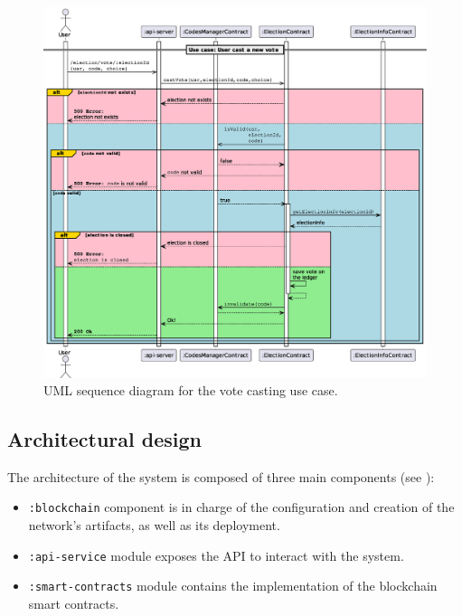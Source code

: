 \documentclass{scrartcl}
\begin{document}
\begin{figure}[h!]
    \centering
    \includegraphics[width=\linewidth]{figures/cast-vote-use-case.eps}
    \caption{UML sequence diagram for the vote casting use case.}
    \label{fig:cast-vote-use-case} 
\end{figure}

\subsection{Architectural design}

The architecture of the system is composed of three main components (see ):
\begin{itemize}
    \item \texttt{:blockchain} component is in charge of the configuration and creation of the network's artifacts, as well as its deployment.
    \item \texttt{:api-service} module exposes the API to interact with the system. 
    \item \texttt{:smart-contracts} module contains the implementation of the blockchain smart contracts.
\end{itemize}
\end{document}
